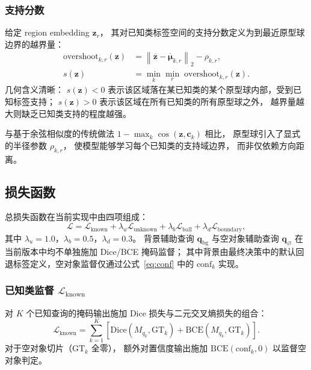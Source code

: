 \documentclass[3p,twocolumn,authoryear]{elsarticle}
\newcommand{\bq}{\mathbf{q}}                              %
\newcommand{\bz}{\mathbf{z}}                              %
\newcommand{\bmu}{\boldsymbol{\mu}}                       %
\begin{document}
\subsubsection{支持分数}\label{sec:method:support:score}

给定 region embedding $\bz_r$，
其对已知类标签空间的支持分数定义为到最近原型球边界的越界量：
\begin{align}
  \text{overshoot}_{k,r}(\bz) &= \left\|\overline{\bz} - \overline{\bmu}_{k,r}\right\|_2 - \rho_{k,r}, \label{eq:overshoot} \\
  s(\bz) &= \min_{k} \min_{r}\; \text{overshoot}_{k,r}(\bz). \label{eq:support_score}
\end{align}
几何含义清晰：
$s(\bz) < 0$ 表示该区域落在某已知类的某个原型球内部，受到已知标签支持；
$s(\bz) > 0$ 表示该区域在所有已知类的所有原型球之外，
越界量越大则缺乏已知类支持的程度越强。

与基于余弦相似度的传统做法 $1 - \max_k \cos(\bz, \mathbf{c}_k)$ 相比，
原型球引入了显式的半径参数 $\rho_{k,r}$，
使模型能够学习每个已知类的支持域边界，
而非仅依赖方向距离。

\subsection{损失函数}\label{sec:method:loss}

总损失函数在当前实现中由四项组成：
\begin{equation}\label{eq:total_loss}
  \mathcal{L} = \mathcal{L}_{\text{known}} + \lambda_u \mathcal{L}_{\text{unknown}} + \lambda_b \mathcal{L}_{\text{ball}} + \lambda_d \mathcal{L}_{\text{boundary}},
\end{equation}
其中 $\lambda_u = 1.0$，$\lambda_b = 0.5$，$\lambda_d = 0.3$。
背景辅助查询 $\bq_{\text{bg}}$ 与空对象辅助查询 $\bq_{\varnothing}$ 在当前版本中均不单独施加 Dice/BCE 掩码监督；
其中背景由最终决策中的默认回退标签定义，空对象监督仅通过公式~\eqref{eq:conf} 中的 $\text{conf}_k$ 实现。

\subsubsection{已知类监督 $\mathcal{L}_{\text{known}}$}\label{sec:method:loss:known}

对 $K$ 个已知查询的掩码输出施加 Dice 损失与二元交叉熵损失的组合：
\begin{equation}\label{eq:loss_known}
  \mathcal{L}_{\text{known}} = \sum_{k=1}^{K} \left[\text{Dice}(M_{q_k}, \text{GT}_k) + \text{BCE}(M_{q_k}, \text{GT}_k)\right].
\end{equation}
对于空对象切片（$\text{GT}_k$ 全零），
额外对置信度输出施加 $\text{BCE}(\text{conf}_k, 0)$ 以监督空对象判定。
\end{document}
